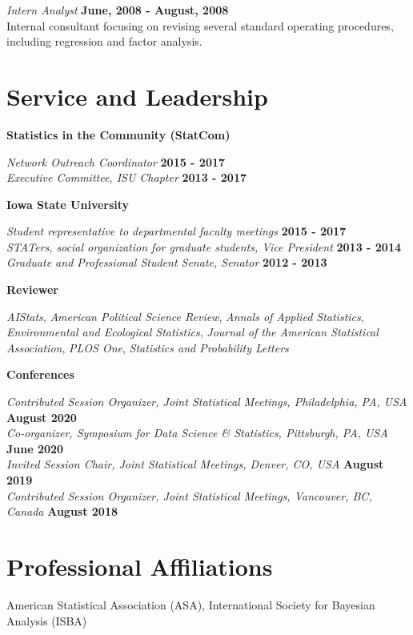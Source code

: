 \documentclass[margin,line]{res}
\begin{document}
\begin{resume}
\vspace{-.3cm}
{\em Intern Analyst} \hfill {\bf  June, 2008 - August, 2008}\\
Internal consultant focusing on revising several standard operating procedures, including regression and factor analysis. 

\section{\sc Service and Leadership}

{\bf Statistics in the Community (StatCom)}

\vspace{-.3cm}
{\em Network Outreach Coordinator} \hfill {\bf 2015 - 2017}\\
{\em Executive Committee, ISU Chapter} \hfill {\bf 2013 - 2017}

{\bf Iowa State University}

\vspace{-.3cm}
{\em Student representative to departmental faculty meetings} \hfill {\bf 2015 - 2017}\\
{\em STATers, social organization for graduate students, Vice President} \hfill {\bf 2013 - 2014}\\
{\em Graduate and Professional Student Senate, Senator} \hfill {\bf 2012 - 2013}


{\bf Reviewer}

\vspace{-.3cm}
{\em AIStats}, {\em American Political Science Review}, {\em Annals of Applied Statistics}, {\em Environmental and Ecological Statistics}, {\em Journal of the American Statistical Association}, {\em PLOS One}, {\em Statistics and Probability Letters}


{\bf Conferences}

\vspace{-.3cm}
{\em Contributed Session Organizer, Joint Statistical Meetings, Philadelphia, PA, USA} \hfill {\bf August 2020} \\
{\em Co-organizer, Symposium for Data Science \& Statistics, Pittsburgh, PA, USA} \hfill {\bf June 2020} \\
{\em Invited Session Chair, Joint Statistical Meetings, Denver, CO, USA} \hfill {\bf August 2019} \\
{\em Contributed Session Organizer, Joint Statistical Meetings, Vancouver, BC, Canada} \hfill {\bf August 2018}

\section{\sc Professional Affiliations}
American Statistical Association (ASA), International Society for Bayesian Analysis (ISBA)


\end{resume}
\end{document}
